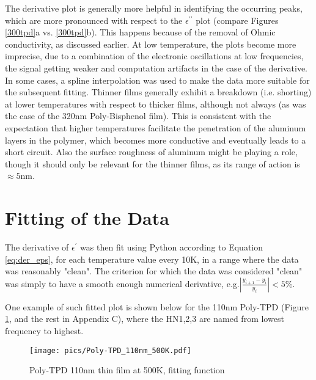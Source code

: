 The derivative plot is generally  more helpful in identifying the occurring peaks, which are more pronounced with respect to the $\epsilon^{\prime\prime}$ plot (compare Figures \ref{300tpd}a vs. \ref{300tpd}b). This happens because of the removal of Ohmic conductivity, as discussed earlier. %
At low temperature, the plots become more imprecise, due to a combination of the electronic oscillations at low frequencies, the signal getting weaker and computation artifacts in the case of the derivative. In some cases, a spline interpolation was used to make the data more suitable for the subsequent fitting.
Thinner films generally exhibit a breakdown (i.e. shorting) at lower temperatures with respect to thicker films, although not always (as was the case of the 320nm Poly-Bisphenol film). This is consistent with the expectation that higher temperatures facilitate the penetration of the aluminum layers in the polymer, which becomes more conductive and eventually leads to a short circuit. Also the surface roughness of aluminum might be playing a role, though it should only be relevant for the thinner films, as its range of action is $\approx 5 \text{nm}$.














\section{Fitting of the Data}
The derivative of $\epsilon^{\prime}$ was then fit using Python according to Equation \ref{eq:der_eps}, for each temperature value every 10K, in a range where the data was reasonably "clean". The criterion for which the data was considered "clean" was simply to have a smooth enough numerical derivative, e.g.$ \left| \frac{y_{i+1} - y_i}{y_i} \right| < \text{5\%} $.


One example of such fitted plot is shown below for the 110nm Poly-TPD (Figure \ref{tpd110}, and the rest in Appendix C), where the HN1,2,3 are named from lowest frequency to highest.

\begin{figure}[!htb]
	\centering
  \texttt{[image: pics/Poly-TPD\_110nm\_500K.pdf]}
  \caption{Poly-TPD 110nm thin film at 500K, fitting function}
  \label{tpd110}
\end{figure}







